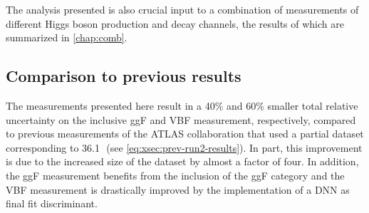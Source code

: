 The analysis presented is also crucial input to a combination of measurements of different Higgs boson production and decay channels, the results of which are summarized in \cref{chap:comb}.


\subsection{Comparison to previous results}
The measurements presented here result in a 40\% and 60\% smaller total relative uncertainty on the inclusive ggF and VBF measurement, respectively, compared to previous \RunTwo measurements of the ATLAS collaboration that used a partial \RunTwo dataset corresponding to 36.1\,\ifb\ (see \cref{eq:xsec:prev-run2-results}). 
In part, this improvement is due to the increased size of the dataset by almost a factor of four.
In addition, the ggF measurement benefits from the inclusion of the ggF \TwoJet category and the VBF measurement is drastically improved by the implementation of a DNN as final fit discriminant. 

